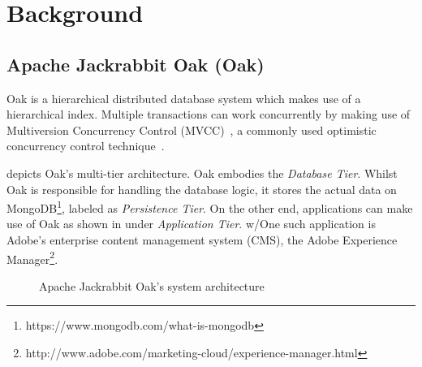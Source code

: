 \documentclass[abstracton,12pt]{scrartcl}
\theoremstyle{definition}
\begin{document}
\section{Background}

\subsection{Apache Jackrabbit Oak (Oak)}

Oak is a hierarchical distributed database system which makes use of a
hierarchical index. Multiple transactions can work concurrently by making use of
Multiversion Concurrency Control (MVCC)~\cite{GW02}, a commonly used optimistic
concurrency control technique~\cite{TM11}.

 depicts Oak's multi-tier architecture. Oak embodies the
\textit{Database Tier}.
Whilst Oak is responsible for handling the database logic, it stores the actual
data on MongoDB\footnote{https://www.mongodb.com/what-is-mongodb}, labeled as
\textit{Persistence Tier}. On the other end, applications can make use of Oak as
shown in  under \textit{Application Tier}.
w/One such application is Adobe's enterprise content management system (CMS),
the Adobe Experience
Manager\footnote{http://www.adobe.com/marketing-cloud/experience-manager.html}.

\begin{figure}[h]
  \begin{center}
  \end{center}
  \caption{Apache Jackrabbit Oak's system architecture}
  \label{fig:architecture}
\end{figure}
\end{document}

